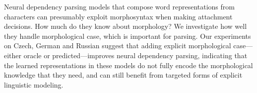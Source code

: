 Neural dependency parsing models that compose word representations from characters can presumably exploit morphosyntax when making attachment decisions. How much do they know about morphology? We investigate how well they handle morphological case, which is important for parsing. Our experiments on Czech, German and Russian suggest that adding explicit morphological case---either oracle or predicted---improves neural dependency parsing, indicating that the learned representations in these models do not fully encode the morphological knowledge that they need, and can still benefit from targeted forms of explicit linguistic modeling.
